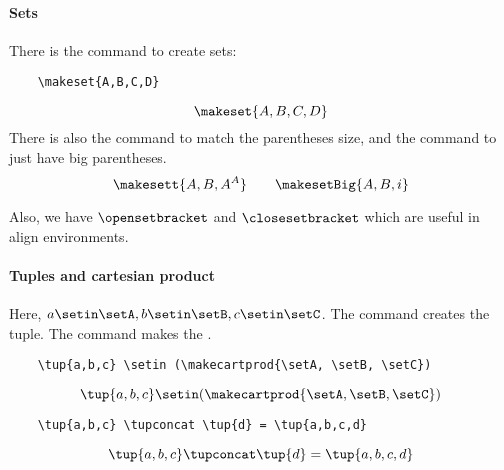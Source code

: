 \paragraph{Sets}
There is the command \str{\makeset} to create sets:
\begin{verbatim}
    \makeset{A,B,C,D}
\end{verbatim}
\begin{equation}
    \makeset{A,B,C,D}
\end{equation}
There is also the command \str{\makesett} to match the parentheses size, and the command\linebreak[1] \str{\makesetBig} to just have big parentheses.
\begin{equation}
    \makesett{A, B, A^A}
    \qquad
    \makesetBig{A, B, i}
\end{equation}

Also, we have \str{\opensetbracket} $\opensetbracket$ and \str{\closesetbracket} $\closesetbracket$ which are useful in align environments.

\paragraph{Tuples and cartesian product}
Here, $a\setin \setA, b \setin \setB, c \setin \setC$.
The command \str{\tup} creates the tuple. The command \str{\makecartprod} makes the .
\begin{verbatim}
    \tup{a,b,c} \setin (\makecartprod{\setA, \setB, \setC})
\end{verbatim}
\begin{equation}
    \tup{a,b,c} \setin (\makecartprod{\setA, \setB, \setC})
\end{equation}
\begin{verbatim}
    \tup{a,b,c} \tupconcat \tup{d} = \tup{a,b,c,d}
\end{verbatim}
\begin{equation}
    \tup{a,b,c} \tupconcat \tup{d} = \tup{a,b,c,d}
\end{equation}


